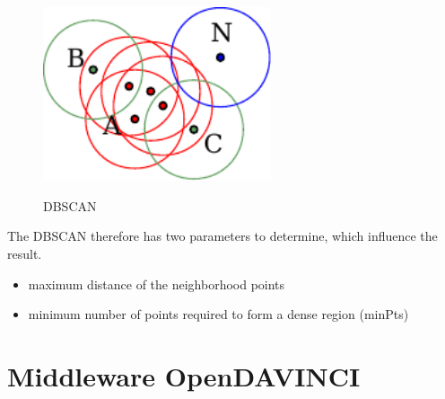 \begin{figure}[!ht]
\begin{center}
\caption{\acs{DBSCAN}}
\includegraphics[width=0.6\textwidth]{bilder/dbscan.pdf}
\label{dbscan}
\end{center}
\end{figure}


The \ac {DBSCAN} therefore has two parameters to determine, which influence the result.
\begin{itemize}
 \item maximum distance of the neighborhood points
 \item minimum number of points required to form a dense region (minPts)
\end{itemize}






\section{Middleware OpenDAVINCI}


